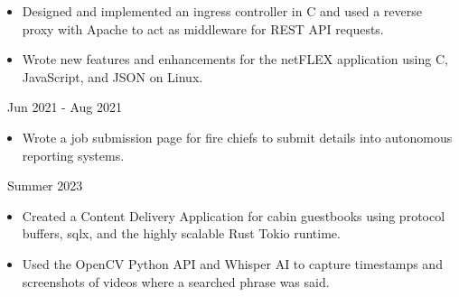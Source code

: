 \documentclass[11pt,letterpaper,ragged2e]{altacv}
\begin{document}
{
\begin{itemize}
    \item Designed and implemented an ingress controller in C and used a reverse proxy with Apache to act as middleware for REST API requests. 
    \item Wrote new features and enhancements for the netFLEX application using C,  JavaScript, and JSON on Linux.
\end{itemize}
}
{\faCalendar\, Jun 2021 - Aug 2021}
{
}

{
\begin{itemize}
    \item Wrote a job submission page for fire chiefs to submit details into autonomous reporting systems.
\end{itemize}
}
{\faCalendar\, Summer 2023}
{
}



{
\begin{itemize}
  \item Created a Content Delivery Application for cabin guestbooks using protocol buffers, sqlx, and the highly scalable Rust Tokio runtime.
\end{itemize}
}
{
}

{
\begin{itemize}
    \item Used the OpenCV Python API and Whisper AI to capture timestamps and screenshots of videos where a searched phrase was said.
\end{itemize}
}
{
}
\end{document}
